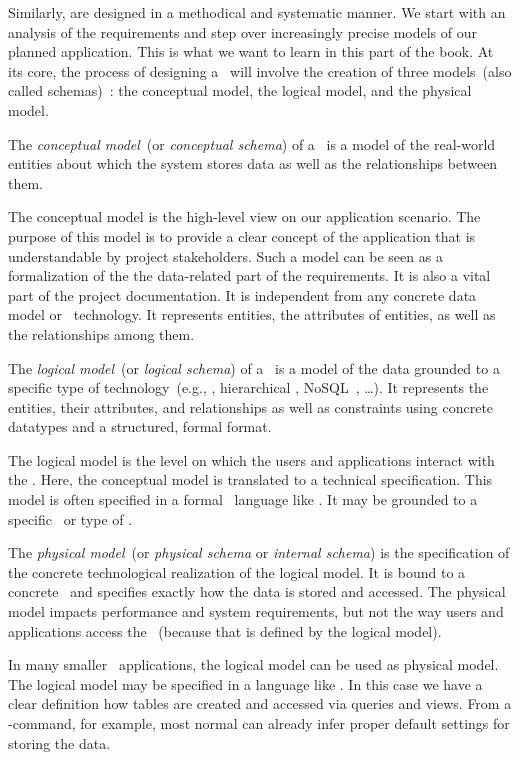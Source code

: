Similarly,  are designed in a methodical and systematic manner.
We start with an analysis of the requirements and step over increasingly precise models of our planned application.
This is what we want to learn in this part of the book.
At its core, the process of designing a \db\ will involve the creation of three models~(also called schemas)~\cite{EN2015FODS}: %
the conceptual model, the logical model, and the physical model.%
%
\begin{definition}%
The \emph{conceptual model}~(or \emph{conceptual schema}) of a \db\ is a model of the real-world entities about which the system stores data as well as the relationships between them.%
\end{definition}%
%
The conceptual model is the high-level view on our application scenario.
The purpose of this model is to provide a clear concept of the application that is understandable by project stakeholders.
Such a model can be seen as a formalization of the the data-related part of the requirements.
It is also a vital part of the project documentation.
It is independent from any concrete data model or \db\ technology.
It represents entities, the attributes of entities, as well as the relationships among them.
%
\begin{definition}%
\label{def:logicalModel}%
The \emph{logical model}~(or \emph{logical schema}) of a \db\ is a model of the data grounded to a specific type of technology~(e.g., , hierarchical \db, NoSQL~\db, \dots). %
It represents the entities, their attributes, and relationships as well as constraints using concrete datatypes and a structured, formal format.%
\end{definition}%
%
The logical model is the level on which the users and applications interact with the \db.
Here, the conceptual model is translated to a technical specification.
This model is often specified in a formal \db\ language like \sql.
It may be grounded to a specific \dbms\ or type of \dbms.%
%
\begin{definition}%
The \emph{physical model}~(or \emph{physical schema} or \emph{internal schema}) is the specification of the concrete technological realization of the logical model. %
It is bound to a concrete \dbms\ and specifies exactly how the data is stored and accessed. %
The physical model impacts performance and system requirements, but not the way users and applications access the \db~(because that is defined by the logical model).%
\end{definition}%
%
In many smaller \db\ applications, the logical model can be used as physical model.
The logical model may be specified in a language like \sql.
In this case we have a clear definition how tables are created and accessed via queries and views.
From a -command, for example, most normal  can already infer proper default settings for storing the data.

